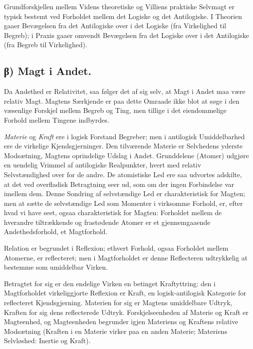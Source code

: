 \documentclass[12pt]{book}
\newcommand{\opage}[1]{\marginnote{\footnotesize\textit{[#1]}}}
\begin{document}
Grundforskjellen mellem Videns theoretiske og Villiens
praktiske Selvmagt er typisk bestemt ved Forholdet mellem
det Logiske og det Antilogiske. I Theorien gaaer
Bevægelsen fra det Antilogiske over i det Logiske (fra Virkelighed til
Begreb); i Praxis gaaer omvendt Bevægelsen fra det Logiske
over i det Antilogiske (fra Begreb til Virkelighed).

\subsection*{β) Magt i Andet.}

Da Andethed er Relativitet, saa
følger det af sig selv, at Magt i Andet maa være relativ
Magt. Magtens Særkjende er paa dette Omraade ikke blot
at søge i den væsenlige Forskjel mellem Begreb og Ting,
men tillige i det eiendommelige Forhold mellem Tingene
indbyrdes.

\emph{Materie} og \emph{Kraft} ere i logisk Forstand Begreber;
men i antilogisk Umiddelbarhed ere de virkelige
Kjendsgjerninger. Den tilværende Materie er Selvhedens yderste
Modsætning, Magtens oprindelige Udslag i Andet.
Grunddelene (Atomer) udgjøre en uendelig Vrimmel af antilogiske
Realpunkter, hvert med relativ Selvstændighed over for de
andre. De atomistiske Led ere saa udvortes adskilte, at det
ved overfladisk Betragtning seer ud, som om der ingen
Forbindelse var imellem dem. Denne Sondring af selvstændige
Led er charakteristisk for Magten; men at sætte de
selvstændige Led som Momenter i virksomme Forhold, er, efter hvad
vi have seet, ogsaa charakteristisk for Magten: Forholdet
mellem de hverandre tiltrækkende og frastødende Atomer er et
gjennemgaaende Andethedsforhold, et Magtforhold.

\opage{34} Relation er begrundet i Reflexion; ethvert Forhold,
ogsaa Forholdet mellem Atomerne, er reflecteret; men i
Magtforholdet er denne Reflecteren udtrykkelig at bestemme som
umiddelbar Virken.

Betragtet for sig er den endelige Virken en betinget
Kraftyttring: den i Magtforholdet virkeliggjorte Reflexion er
Kraft, en logisk-antilogisk Kategorie for reflecteret
Kjendsgjerning. Materien for sig er Magtens umiddelbare Udtryk,
Kraften for sig dens reflecterede Udtryk. Forskjelseenheden
af Materie og Kraft er Magteenhed, og Magteenheden
begrunder igjen Materiens og Kraftens relative Modsætning
(Kraften i en Materie virker paa en anden Materie;
Materiens Selvløshed: Inertie og Kraft).
\end{document}
